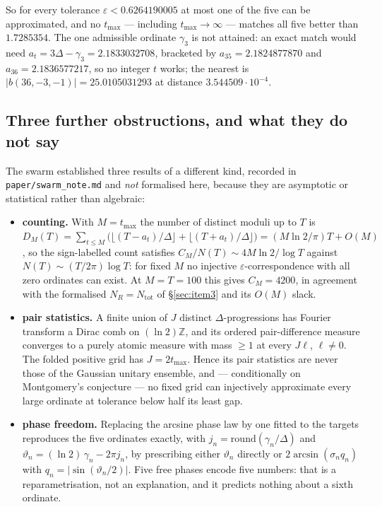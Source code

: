 \documentclass[11pt,a4paper]{article}
\newcommand{\lb}{\_\allowbreak}
\newcommand{\code}[1]{\texttt{#1}}
\theoremstyle{definition}
\theoremstyle{remark}
\begin{document}
So for every tolerance $\varepsilon < 0.6264190005$ at most one of the five can be approximated,
and no $t_{\max}$ --- including $t_{\max} \to \infty$ --- matches all five better than $1.7285354$.
The one admissible ordinate $\gamma_3$ is not attained: an exact match would need
$a_t = 3\Delta - \gamma_3 = 2.1833032708$, bracketed by $a_{35} = 2.1824877870$ and
$a_{36} = 2.1836577217$, so no integer $t$ works; the nearest is $|b(36,-3,-1)| = 25.0105031293$ at
distance $3.544509\cdot 10^{-4}$.

\subsection{Three further obstructions, and what they do not say}

The swarm established three results of a different kind, recorded in \code{paper/swarm\lb note.md}
and \emph{not} formalised here, because they are asymptotic or statistical rather than algebraic:

\begin{itemize}
\item \textbf{counting.} With $M = t_{\max}$ the number of distinct moduli up to $T$ is
  $D_M(T) = \sum_{t\le M}\bigl(\lfloor (T-a_t)/\Delta\rfloor + \lfloor (T+a_t)/\Delta\rfloor\bigr)
  = (M\ln 2/\pi)T + O(M)$, so the sign-labelled count satisfies $C_M/N(T) \sim 4M\ln 2/\log T$
  against $N(T) \sim (T/2\pi)\log T$: for fixed $M$ no injective $\varepsilon$-correspondence with
  all zero ordinates can exist. At $M = T = 100$ this gives $C_M = 4200$, in agreement with the
  formalised $N_R = N_{\mathrm{tot}}$ of \S\ref{sec:item3} and its $O(M)$ slack.
\item \textbf{pair statistics.} A finite union of $J$ distinct $\Delta$-progressions has Fourier
  transform a Dirac comb on $(\ln 2)\mathbb Z$, and its ordered pair-difference measure converges to
  a purely atomic measure with mass $\ge 1$ at every $J\ell$, $\ell \ne 0$. The folded positive
  grid has $J = 2t_{\max}$. Hence its pair statistics are never those of the Gaussian unitary
  ensemble, and --- conditionally on Montgomery's conjecture --- no fixed grid can injectively
  approximate every large ordinate at tolerance below half its least gap.
\item \textbf{phase freedom.} Replacing the arcsine phase law by one fitted to the targets
  reproduces the five ordinates exactly, with $j_n = \mathrm{round}(\gamma_n/\Delta)$ and
  $\vartheta_n = (\ln 2)\,\gamma_n - 2\pi j_n$, by prescribing either $\vartheta_n$ directly or
  $2\arcsin(\sigma_n q_n)$ with $q_n = |\sin(\vartheta_n/2)|$. Five free phases encode five numbers:
  that is a reparametrisation, not an explanation, and it predicts nothing about a sixth ordinate.
\end{itemize}
\end{document}
